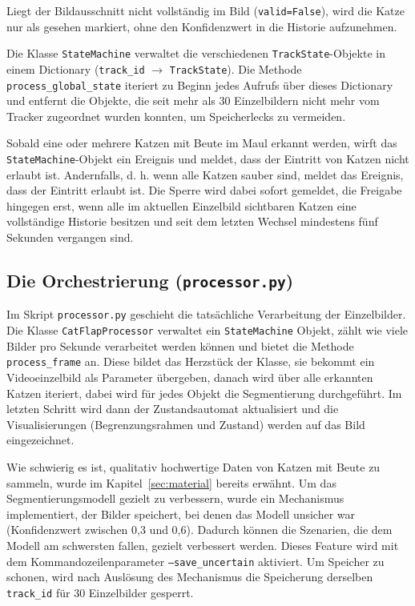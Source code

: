 Liegt der Bildausschnitt nicht vollständig im Bild (\texttt{valid=False}), wird die Katze nur als gesehen markiert, ohne den Konfidenzwert in die Historie aufzunehmen.

Die Klasse \texttt{StateMachine} verwaltet die verschiedenen \texttt{TrackState}-Objekte in einem Dictionary (\texttt{track\_id} $\rightarrow$ \texttt{TrackState}). Die Methode \texttt{process\_global\_state} iteriert zu Beginn jedes Aufrufs über dieses Dictionary und entfernt die Objekte, die seit mehr als 30 Einzelbildern nicht mehr vom Tracker zugeordnet wurden konnten, um Speicherlecks zu vermeiden.

Sobald eine oder mehrere Katzen mit Beute im Maul erkannt werden, wirft das \texttt{StateMachine}-Objekt ein Ereignis und meldet, dass der Eintritt von Katzen nicht erlaubt ist. Andernfalls, d. h. wenn alle Katzen sauber sind, meldet das Ereignis, dass der Eintritt erlaubt ist. Die Sperre wird dabei sofort gemeldet, die Freigabe hingegen erst, wenn alle im aktuellen Einzelbild sichtbaren Katzen eine vollständige Historie besitzen und seit dem letzten Wechsel mindestens fünf Sekunden vergangen sind.

\subsection{Die Orchestrierung (\texttt{processor.py})}
Im Skript \texttt{processor.py} geschieht die tatsächliche Verarbeitung der Einzelbilder. Die Klasse \texttt{CatFlapProcessor} verwaltet ein \texttt{StateMachine} Objekt, zählt wie viele Bilder pro Sekunde verarbeitet werden können und bietet die Methode \texttt{process\_frame} an. Diese bildet das Herzstück der Klasse, sie bekommt ein Videoeinzelbild als Parameter übergeben, danach wird über alle erkannten Katzen iteriert, dabei wird für jedes Objekt die Segmentierung durchgeführt. Im letzten Schritt wird dann der Zustandsautomat aktualisiert und die Visualisierungen (Begrenzungsrahmen und Zustand) werden auf das Bild eingezeichnet.

Wie schwierig es ist, qualitativ hochwertige Daten von Katzen mit Beute zu sammeln, wurde im Kapitel~\ref{sec:material} bereits erwähnt. Um das Segmentierungsmodell gezielt zu verbessern, wurde ein Mechanismus implementiert, der Bilder speichert, bei denen das Modell unsicher war (Konfidenzwert zwischen 0,3 und 0,6). Dadurch können die Szenarien, die dem Modell am schwersten fallen, gezielt verbessert werden. Dieses Feature wird mit dem Kommandozeilenparameter \texttt{--save\_uncertain} aktiviert. Um Speicher zu schonen, wird nach Auslösung des Mechanismus die Speicherung derselben \texttt{track\_id} für 30 Einzelbilder gesperrt.

